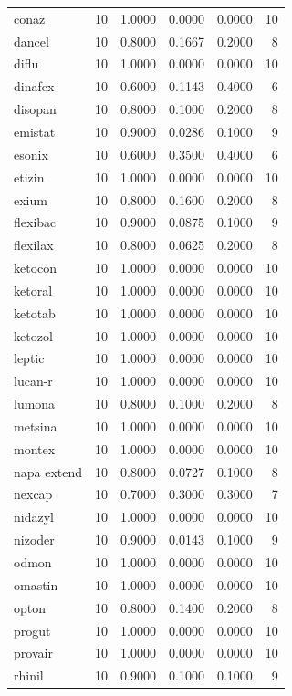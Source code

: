 \begin{longtable}{p{3.0cm}rrrrr}
conaz & 10 & 1.0000 & 0.0000 & 0.0000 & 10 \\
dancel & 10 & 0.8000 & 0.1667 & 0.2000 & 8 \\
diflu & 10 & 1.0000 & 0.0000 & 0.0000 & 10 \\
dinafex & 10 & 0.6000 & 0.1143 & 0.4000 & 6 \\
disopan & 10 & 0.8000 & 0.1000 & 0.2000 & 8 \\
emistat & 10 & 0.9000 & 0.0286 & 0.1000 & 9 \\
esonix & 10 & 0.6000 & 0.3500 & 0.4000 & 6 \\
etizin & 10 & 1.0000 & 0.0000 & 0.0000 & 10 \\
exium & 10 & 0.8000 & 0.1600 & 0.2000 & 8 \\
flexibac & 10 & 0.9000 & 0.0875 & 0.1000 & 9 \\
flexilax & 10 & 0.8000 & 0.0625 & 0.2000 & 8 \\
ketocon & 10 & 1.0000 & 0.0000 & 0.0000 & 10 \\
ketoral & 10 & 1.0000 & 0.0000 & 0.0000 & 10 \\
ketotab & 10 & 1.0000 & 0.0000 & 0.0000 & 10 \\
ketozol & 10 & 1.0000 & 0.0000 & 0.0000 & 10 \\
leptic & 10 & 1.0000 & 0.0000 & 0.0000 & 10 \\
lucan-r & 10 & 1.0000 & 0.0000 & 0.0000 & 10 \\
lumona & 10 & 0.8000 & 0.1000 & 0.2000 & 8 \\
metsina & 10 & 1.0000 & 0.0000 & 0.0000 & 10 \\
montex & 10 & 1.0000 & 0.0000 & 0.0000 & 10 \\
napa extend & 10 & 0.8000 & 0.0727 & 0.1000 & 8 \\
nexcap & 10 & 0.7000 & 0.3000 & 0.3000 & 7 \\
nidazyl & 10 & 1.0000 & 0.0000 & 0.0000 & 10 \\
nizoder & 10 & 0.9000 & 0.0143 & 0.1000 & 9 \\
odmon & 10 & 1.0000 & 0.0000 & 0.0000 & 10 \\
omastin & 10 & 1.0000 & 0.0000 & 0.0000 & 10 \\
opton & 10 & 0.8000 & 0.1400 & 0.2000 & 8 \\
progut & 10 & 1.0000 & 0.0000 & 0.0000 & 10 \\
provair & 10 & 1.0000 & 0.0000 & 0.0000 & 10 \\
rhinil & 10 & 0.9000 & 0.1000 & 0.1000 & 9 \\

\end{longtable}
